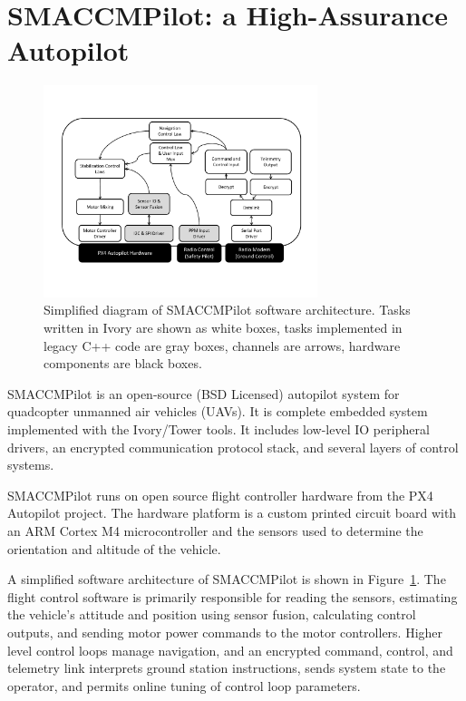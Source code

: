 \section{SMACCMPilot: a High-Assurance Autopilot}
\label{sec:smaccmpilot}

\begin{figure}[ht!]
  \begin{center}
\includegraphics[width=8cm]{figures/smaccmpilot-diagram-jan14}
  \end{center}
\caption[SMACCMPilot software architecture]{
Simplified diagram of SMACCMPilot
software architecture. Tasks written in Ivory are shown as white boxes,
tasks implemented in legacy C++ code are gray boxes,
channels are arrows,
hardware components are black boxes.}
\label{fig:smaccmpilotSwArch}
\end{figure}

SMACCMPilot is an open-source (BSD Licensed) autopilot system for quadcopter
unmanned air vehicles (UAVs).
It is complete embedded system implemented with
the Ivory/Tower tools.
It includes low-level IO peripheral drivers, an encrypted
communication protocol stack, and several layers of control systems.

SMACCMPilot runs on open source flight controller hardware from the PX4
Autopilot project.\cite{px4-proj} The hardware platform is
a custom printed circuit board with an ARM Cortex M4 microcontroller and the
sensors used to determine the orientation and altitude of the vehicle.


A simplified software architecture of SMACCMPilot is shown in
Figure~\ref{fig:smaccmpilotSwArch}.
The flight control software is primarily responsible for reading the sensors,
estimating the vehicle's attitude and position using sensor fusion, calculating
control outputs, and sending motor power commands to the motor controllers.
Higher level control loops manage navigation, and an encrypted command, control,
and telemetry link interprets ground station instructions, sends system state to
the operator, and permits online tuning of control loop parameters.

